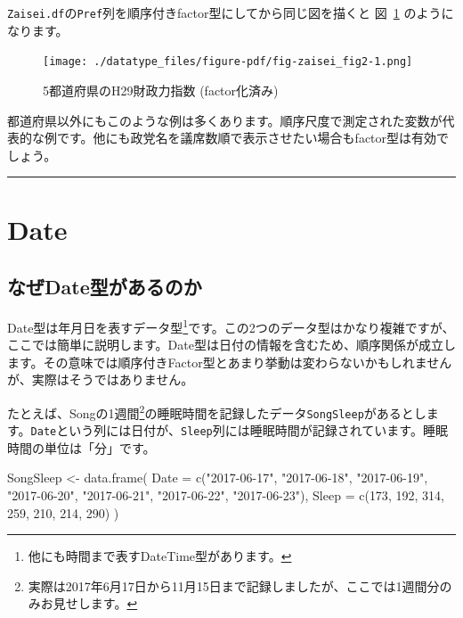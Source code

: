 \documentclass[
  a4paper,
  pandoc,
  ja=standard,
  jafont=haranoaji]{bxjsbook}
\newenvironment{Shaded}{\begin{snugshade}}{\end{snugshade}}
\newcommand{\AttributeTok}[1]{\textcolor[rgb]{0.00,0.48,0.65}{#1}}
\newcommand{\DecValTok}[1]{\textcolor[rgb]{0.68,0.00,0.00}{#1}}
\newcommand{\FunctionTok}[1]{\textcolor[rgb]{0.28,0.35,0.67}{#1}}
\newcommand{\NormalTok}[1]{\textcolor[rgb]{0.00,0.48,0.65}{#1}}
\newcommand{\OtherTok}[1]{\textcolor[rgb]{0.00,0.48,0.65}{#1}}
\newcommand{\StringTok}[1]{\textcolor[rgb]{0.13,0.47,0.30}{#1}}
\begin{document}
\texttt{Zaisei.df}の\texttt{Pref}列を順序付きfactor型にしてから同じ図を描くと
図~\ref{fig-zaisei_fig2} のようになります。

\begin{figure}

{\centering \texttt{[image: ./datatype\_files/figure-pdf/fig-zaisei\_fig2-1.png]}

}

\caption{\label{fig-zaisei_fig2}5都道府県のH29財政力指数 (factor化済み)}

\end{figure}

都道府県以外にもこのような例は多くあります。順序尺度で測定された変数が代表的な例です。他にも政党名を議席数順で表示させたい場合もfactor型は有効でしょう。

\begin{center}\rule{0.5\linewidth}{0.5pt}\end{center}

\hypertarget{sec-type_date}{%
\section{Date}\label{sec-type_date}}

\hypertarget{ux306aux305cdateux578bux304cux3042ux308bux306eux304b}{%
\subsection{なぜDate型があるのか}\label{ux306aux305cdateux578bux304cux3042ux308bux306eux304b}}

Date型は年月日を表すデータ型\footnote{他にも時間まで表すDateTime型があります。}です。この2つのデータ型はかなり複雑ですが、ここでは簡単に説明します。Date型は日付の情報を含むため、順序関係が成立します。その意味では順序付きFactor型とあまり挙動は変わらないかもしれませんが、実際はそうではありません。

たとえば、Songの1週間\footnote{実際は2017年6月17日から11月15日まで記録しましたが、ここでは1週間分のみお見せします。}の睡眠時間を記録したデータ\texttt{SongSleep}があるとします。\texttt{Date}という列には日付が、\texttt{Sleep}列には睡眠時間が記録されています。睡眠時間の単位は「分」です。

\begin{Shaded}
\begin{Highlighting}[numbers=left,,]
\NormalTok{SongSleep }\OtherTok{\textless{}{-}} \FunctionTok{data.frame}\NormalTok{(}
    \AttributeTok{Date  =} \FunctionTok{c}\NormalTok{(}\StringTok{"2017{-}06{-}17"}\NormalTok{, }\StringTok{"2017{-}06{-}18"}\NormalTok{, }\StringTok{"2017{-}06{-}19"}\NormalTok{, }\StringTok{"2017{-}06{-}20"}\NormalTok{, }
              \StringTok{"2017{-}06{-}21"}\NormalTok{, }\StringTok{"2017{-}06{-}22"}\NormalTok{, }\StringTok{"2017{-}06{-}23"}\NormalTok{),}
    \AttributeTok{Sleep =} \FunctionTok{c}\NormalTok{(}\DecValTok{173}\NormalTok{, }\DecValTok{192}\NormalTok{, }\DecValTok{314}\NormalTok{, }\DecValTok{259}\NormalTok{, }\DecValTok{210}\NormalTok{, }\DecValTok{214}\NormalTok{, }\DecValTok{290}\NormalTok{)   }
\NormalTok{)}
\end{Highlighting}
\end{Shaded}
\end{document}
